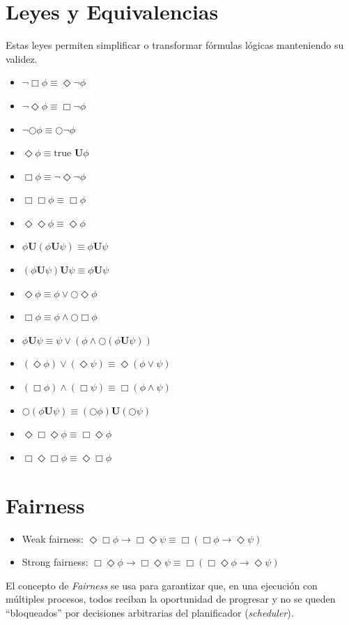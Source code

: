 \documentclass[11pt,a4paper]{article}
\begin{document}
\section{Leyes y Equivalencias}
Estas leyes permiten simplificar o transformar fórmulas lógicas manteniendo su validez.
\begin{itemize}
    \item $\neg \Box \phi \equiv \Diamond \neg \phi$
    \item $\neg \Diamond \phi \equiv \Box \neg \phi$
    \item $\neg \bigcirc \phi \equiv \bigcirc \neg \phi$
    \item $\Diamond \phi \equiv \text{true } \mathbf{U} \phi$
    \item $\Box \phi \equiv \neg \Diamond \neg \phi$
    \item $\Box \Box \phi \equiv \Box \phi$
    \item $\Diamond \Diamond \phi \equiv \Diamond \phi$
    \item $\phi \mathbf{U} (\phi \mathbf{U} \psi) \equiv \phi \mathbf{U} \psi$
    \item $(\phi \mathbf{U} \psi) \mathbf{U} \psi \equiv \phi \mathbf{U} \psi$
    \item $\Diamond \phi \equiv \phi \vee \bigcirc \Diamond \phi$
    \item $\Box \phi \equiv \phi \wedge \bigcirc \Box \phi$
    \item $\phi \mathbf{U} \psi \equiv \psi \vee (\phi \wedge \bigcirc (\phi \mathbf{U} \psi))$
    \item $(\Diamond \phi) \vee (\Diamond \psi) \equiv \Diamond (\phi \vee \psi)$
    \item $(\Box \phi) \wedge (\Box \psi) \equiv \Box (\phi \wedge \psi)$
    \item $\bigcirc (\phi \mathbf{U} \psi) \equiv (\bigcirc \phi) \mathbf{U} (\bigcirc \psi)$
    \item $\Diamond \Box \Diamond \phi \equiv \Box \Diamond \phi$
    \item $\Box \Diamond \Box \phi \equiv \Diamond \Box \phi$
\end{itemize}

\section{Fairness}
\begin{itemize}
    \item Weak fairness: $\Diamond \Box \phi \rightarrow \Box \Diamond \psi \equiv \Box (\Box \phi \rightarrow \Diamond \psi)$
    \item Strong fairness: $\Box \Diamond \phi \rightarrow \Box \Diamond \psi \equiv \Box (\Box \Diamond \phi \rightarrow \Diamond \psi)$
\end{itemize}
El concepto de \textit{Fairness} se usa para garantizar que, en una ejecución con múltiples procesos, todos reciban la oportunidad de progresar y no se queden ``bloqueados'' por decisiones arbitrarias del planificador (\textit{scheduler}).
\end{document}
